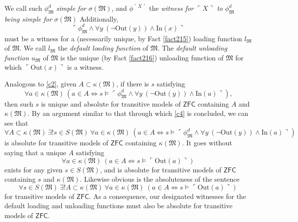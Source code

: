 \documentclass[12pt]{article}
\numberwithin{equation}{section}
\begin{document}
We call such $\phi^d_{\mathfrak{M}}$ \emph{simple for} $\sigma(\mathfrak{M})$, and $\phi^{\ulcorner X \urcorner}$ the \emph{witness for} $\ulcorner X \urcorner$ \emph{to} $\phi^d_{\mathfrak{M}}$ \emph{being simple for} $\sigma(\mathfrak{M})$ Additionally,
\begin{equation*}
    \ulcorner \phi^d_{\mathfrak{M}} \wedge \forall y \ (\neg \mathrm{Out}(y)) \wedge \mathrm{In}(x) \urcorner
\end{equation*}
must be a witness for a (necessarily unique, by Fact \ref{fact215}) loading function $l_{\mathfrak{M}}$ of $\mathfrak{M}$. We call $l_{\mathfrak{M}}$ the \emph{default loading function} of $\mathfrak{M}$. The \emph{default unloading function} $u_{\mathfrak{M}}$ of $\mathfrak{M}$ is the unique (by Fact \ref{fact216}) unloading function of $\mathfrak{M}$ for which $\ulcorner \mathrm{Out}(x) \urcorner$ is a witness.

Analogous to \ref{c2}, given $A \subset \kappa(\mathfrak{M})$, if there is $s$ satisfying
\begin{equation*}
    \forall a \in \kappa(\mathfrak{M}) \ (a \in A \iff s \models \ulcorner \phi^d_{\mathfrak{M}} \wedge \forall y \ (\neg \mathrm{Out}(y)) \wedge \mathrm{In}(a) \urcorner) \text{,}
\end{equation*}
then such $s$ is unique and absolute for transitive models of $\mathsf{ZFC}$ containing $A$ and $\kappa(\mathfrak{M})$. By an argument similar to that through which \ref{c4} is concluded, we can see that 
\begin{equation*}
    \forall A \subset \kappa(\mathfrak{M}) \ \exists ! s \in S(\mathfrak{M}) \ \forall a \in \kappa(\mathfrak{M}) \ (a \in A \iff s \models \ulcorner \phi^d_{\mathfrak{M}} \wedge \forall y \ (\neg \mathrm{Out}(y)) \wedge \mathrm{In}(a) \urcorner)
\end{equation*}
is absolute for transitive models of $\mathsf{ZFC}$ containing $\kappa(\mathfrak{M})$. It goes without saying that a unique $A$ satisfying
\begin{equation*}
    \forall a \in \kappa(\mathfrak{M}) \ (a \in A \iff s \models \ulcorner \mathrm{Out}(a) \urcorner)
\end{equation*}
exists for any given $s \in S(\mathfrak{M})$, and is absolute for transitive models of $\mathsf{ZFC}$ containing $s$ and $\kappa(\mathfrak{M})$. Likewise obvious is the absoluteness of the sentence
\begin{equation*}
    \forall s \in S(\mathfrak{M}) \ \exists ! A \subset \kappa(\mathfrak{M}) \ \forall a \in \kappa(\mathfrak{M}) \ (a \in A \iff s \models \ulcorner \mathrm{Out}(a) \urcorner)
\end{equation*}
for transitive models of $\mathsf{ZFC}$. As a consequence, our designated witnesses for the default loading and unloading functions must also be absolute for transitive models of $\mathsf{ZFC}$.
\end{document}
